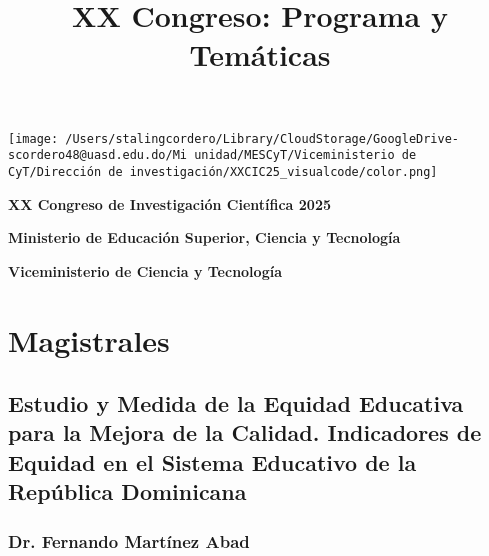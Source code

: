 \documentclass[11pt,a4paper]{article}
\title{XX Congreso: Programa y Temáticas}
\author{}
\date{}
\begin{document}
\begin{titlepage}
    \centering
    
    \texttt{[image: /Users/stalingcordero/Library/CloudStorage/GoogleDrive-scordero48@uasd.edu.do/Mi unidad/MESCyT/Viceministerio de CyT/Dirección de investigación/XXCIC25\_visualcode/color.png]} \\
    \vspace{2cm} %
    
    {\Huge \textbf{XX Congreso de Investigación Científica 2025} \par}
    \vspace{1cm}
    {\LARGE \textbf{Ministerio de Educación Superior, Ciencia y Tecnología} \par}
    \vspace{0.5cm}
    {\Large \textbf{Viceministerio de Ciencia y Tecnología} \par}
    
    \vfill  %
\end{titlepage}


\maketitle
\tableofcontents
\newpage

\section{Magistrales}

\subsection{Estudio y Medida de la Equidad Educativa para la Mejora de la Calidad. Indicadores de Equidad en el Sistema Educativo de la República Dominicana}


\subsubsection*{Dr. Fernando Martínez Abad}
\end{document}
